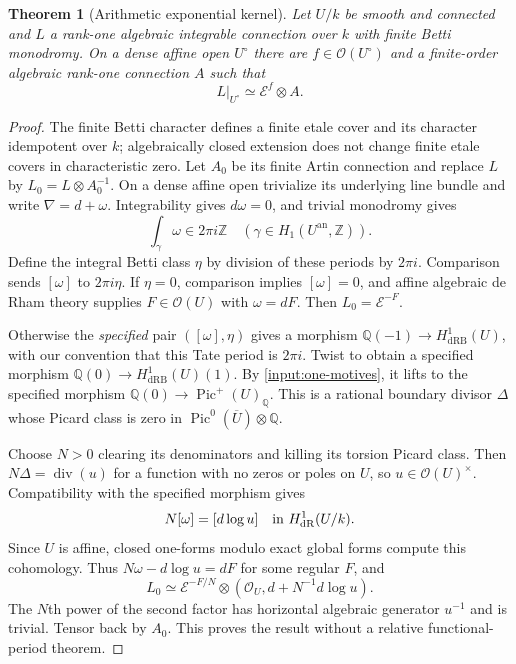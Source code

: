 \documentclass[11pt]{article}
\numberwithin{equation}{section}
\newtheorem{theorem}{Theorem}[section]
\theoremstyle{definition}
\theoremstyle{remark}
\newcommand{\Q}{\mathbb Q}
\newcommand{\Ocal}{\mathcal O}
\newcommand{\Ecal}{\mathcal E}
\newcommand{\dR}{\mathrm{dR}}
\newcommand{\dRB}{\mathrm{dRB}}
\begin{document}
\begin{theorem}[Arithmetic exponential kernel]\label{thm:kernel}
Let $U/k$ be smooth and connected and $L$ a rank-one algebraic integrable
connection over $k$ with finite Betti monodromy. On a dense affine open
$U^\circ$ there are $f\in\Ocal(U^\circ)$ and a finite-order algebraic
rank-one connection $A$ such that
\[
 L|_{U^\circ}\simeq\Ecal^f\otimes A.
\]
\end{theorem}
\begin{proof}
The finite Betti character defines a finite etale cover and its character
idempotent over $k$; algebraically closed extension does not change finite
etale covers in characteristic zero. Let $A_0$ be its finite Artin
connection and replace $L$ by $L_0=L\otimes A_0^{-1}$. On a dense affine
open trivialize its underlying line bundle and write $\nabla=d+\omega$.
Integrability gives $d\omega=0$, and trivial monodromy gives
\[
 \int_\gamma\omega\in2\pi i\mathbb Z
 \quad(\gamma\in H_1(U^{\mathrm{an}},\mathbb Z)).
\]
Define the integral Betti class $\eta$ by division of these periods by
$2\pi i$. Comparison sends $[\omega]$ to $2\pi i\eta$. If $\eta=0$,
comparison implies $[\omega]=0$, and affine algebraic de Rham theory
supplies $F\in\Ocal(U)$ with $\omega=dF$. Then $L_0=\Ecal^{-F}$.

Otherwise the \emph{specified} pair $([\omega],\eta)$ gives a morphism
$\Q(-1)\to H^1_{\dRB}(U)$, with our convention that this Tate period is
$2\pi i$. Twist to obtain a specified morphism
$\Q(0)\to H^1_{\dRB}(U)(1)$. By \cref{input:one-motives}, it lifts to
the specified morphism $\Q(0)\to\operatorname{Pic}^{+}(U)_\Q$.
This is a rational boundary divisor $\Delta$ whose Picard class is zero
in $\operatorname{Pic}^0(\overline U)\otimes\Q$.

Choose $N>0$ clearing its denominators and killing its torsion Picard class.
Then $N\Delta=\operatorname{div}(u)$ for a function with no zeros or
poles on $U$, so $u\in\Ocal(U)^\times$. Compatibility with the specified
morphism gives
\[
 N[\omega]=[d\log u]\quad\hbox{in }H^1_{\dR}(U/k).
\]
Since $U$ is affine, closed one-forms modulo exact global forms compute
this cohomology. Thus $N\omega-d\log u=dF$ for some regular $F$, and
\[
 L_0\simeq\Ecal^{-F/N}\otimes
 (\Ocal_U,d+N^{-1}d\log u).
\]
The $N$th power of the second factor has horizontal algebraic generator
$u^{-1}$ and is trivial. Tensor back by $A_0$. This proves the result
without a relative functional-period theorem.
\end{proof}
\end{document}
